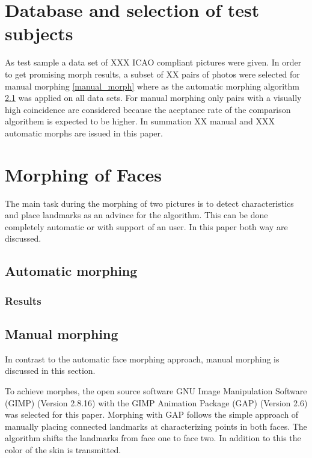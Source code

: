 \section{Database and selection of test subjects}
As test sample a data set of XXX ICAO compliant pictures were given. In order to get promising morph results, a subset of XX  pairs of photos were selected for manual morphing \ref{manual_morph} where as the automatic morphing algorithm \ref{automatic_morph} was applied on all data sets. For manual  morphing only pairs with a visually high coincidence are considered because the aceptance rate of the comparison algorithem is expected to be higher. 
In summation XX manual and XXX automatic morphs are issued in this paper. 


\section{Morphing of Faces}
The main task during the morphing of two pictures is to detect characteristics and place landmarks as an advince for the algorithm. This can be done completely automatic or with support of an user. In this paper both way are discussed.  
\subsection{Automatic morphing}
\label{automatic_morph}
\subsubsection{Results}

\subsection*{Manual morphing}
\label{manual_morph}
In contrast to the automatic face morphing approach, manual morphing is discussed in this section. 

To achieve morphes, the open source software GNU Image Manipulation Software (GIMP) (Version 2.8.16) with the GIMP Animation Package (GAP) (Version 2.6) was selected for this paper. Morphing with GAP follows the simple approach of manually placing connected landmarks at characterizing points in both faces. The algorithm shifts the landmarks from face one to face two. In addition to this the color of the skin is transmitted. 

